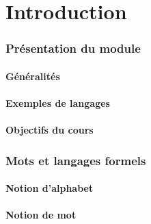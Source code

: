 
\begingroup

\part{Introduction}
 
 
\section{Présentation du module}
 
\subsection{Généralités} 



 
\subsection{Exemples de langages}
 







 
\subsection{Objectifs du cours}

 
\section{Mots et langages formels}
 
\subsection{Notion d'alphabet}

 
\subsection{Notion de mot}






 
